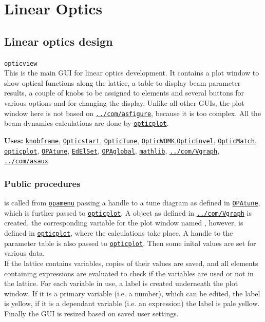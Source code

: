 \documentclass[12pt]{article}
\newcommand\code[1]{{\tt #1}}
\newcommand\guico[1]{{\color{blue}\code{#1}}}
\newcommand\guifco[1]{{\color{violet}\code{#1}}}
\newcommand{\unico}[1]{{\color{burntorange}\code{#1}}}
\newcommand{\opagui}[1]{\colorbox{blue!20}{\code{#1}}}
\newcommand{\oguih}[2]{\subsection{\label{#2}#1}{\Huge\opagui{#2}}\\}
\newcommand{\ogui}[1]{\hyperref[#1]{\opagui{#1}}}
\newcommand{\opaguif}[1]{\colorbox{violet!30}{\code{#1}}}
\newcommand{\oguif}[1]{\hyperref[#1]{\opaguif{#1}}}
\newcommand{\opauni}[1]{\colorbox{orange!30}{\code{#1}}}
\newcommand{\ouni}[1]{\hyperref[#1]{\opauni{#1}}}
\newcommand{\uses}[1]{{\bf Uses: } #1}
\newcommand{\desc}[1]{#1}
\newcommand{\ppro}[1]{\subsubsection*{Public procedures} #1}
\begin{document}
\section{\label{seclino}Linear Optics}

\oguih{Linear optics design}{opticview} 

\desc{This is the main GUI for linear optics development. It contains a plot window to show optical functions along the lattice, a table to display beam parameter results, a couple of knobs to be assigned to elements and several buttons for various options and for changing the display. Unlike all other GUIs, the plot window here is not based on \oguif{../com/asfigure}, because it is too complex. All the beam dynamics calculations are done by \ouni{opticplot}.}

\uses{\oguif{knobframe}, \ogui{Opticstart}, \ogui{OpticTune}, \ogui{OpticWOMK},\ogui{OpticEnvel}, \ogui{OpticMatch}, \ouni{opticplot}, \ogui{OPAtune}, \ogui{EdElSet}, \ouni{OPAglobal}, \ouni{mathlib}, \oguif{../com/Vgraph}, \ouni{../com/asaux}} 

\ppro{
\guico{Init} is called from \ogui{opamenu} passing a handle to a tune diagram as defined in \ogui{OPAtune}, which is further passed to \ouni{opticplot}. A \guifco{Vplot} object as defined in \oguif{../com/Vgraph} is created, the corresponding variable for the plot window named \unico{vp}, however, is defined in \ouni{opticplot}, where the calculations take place. A handle to the parameter table \guico{tab} is also passed to \ouni{opticplot}. Then some inital values are set for various data.\\
If the lattice contains variables, copies of their values are saved, and all elements containing expressions are evaluated to check if the variables are used or not in the lattice. For each variable in use, a label is created underneath the plot window. If it is a primary variable (i.e. a number), which can be edited, the label is yellow, if it is a dependant variable (i.e. an expression) the label is pale yellow.\\
Finally the GUI is resized based on saved user settings.
}
\end{document}
